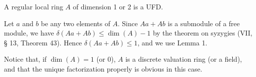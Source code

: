 A regular local ring $A$ of dimension 1 or 2 is a UFD.

Let $a$ and $b$ be any two elements of $A$. Since $Aa + Ab$ is a submodule of a free module, we have $\delta(Aa + Ab) \leq \dim(A) - 1$ by the theorem on syzygies (VII, § 13, Theorem 43). Hence $\delta(Aa + Ab) \leq 1$, and we use Lemma 1.

Notice that, if $\dim(A) = 1$ (or 0), $A$ is a discrete valuation ring (or a field), and that the unique factorization properly is obvious in this case.